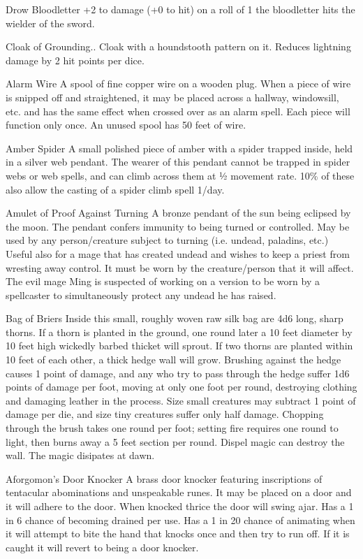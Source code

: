 Drow Bloodletter
+2 to damage (+0 to hit)
on a roll of 1 the bloodletter hits the wielder of the sword.


Cloak of Grounding..
Cloak with a houndstooth pattern on it.  Reduces lightning damage by 2 hit points per dice.  

Alarm Wire
A spool of fine copper wire on a wooden plug. When a piece of wire is snipped off and straightened, it may be placed across a hallway, windowsill, etc. and has the same effect when crossed over as an alarm spell. Each piece will function only once. An unused spool has 50 feet of wire.

Amber Spider
A small polished piece of amber with a spider trapped inside, held in a silver web pendant. The wearer of this pendant cannot be trapped in spider webs or web spells, and can climb across them at ½ movement rate. 10\% of these also allow the casting of a spider climb spell 1/day.

Amulet of Proof Against Turning
A bronze pendant of the sun being eclipsed by the moon. The pendant confers immunity to being turned or controlled. May be used by any person/creature subject to turning (i.e. undead, paladins, etc.) Useful also for a mage that has created undead and wishes to keep a priest from wresting away control. It must be worn by the creature/person that it will affect. The evil mage Ming is suspected of working on a version to be worn by a spellcaster to simultaneously protect any undead he has raised.

 

Bag of Briers
Inside this small, roughly woven raw silk bag are 4d6 long, sharp thorns. If a thorn is planted in the ground, one round later a 10 feet diameter by 10 feet high wickedly barbed thicket will sprout. If two thorns are planted within 10 feet of each other, a thick hedge wall will grow. Brushing against the hedge causes 1 point of damage, and any who try to pass through the hedge suffer 1d6 points of damage per foot, moving at only one foot per round, destroying clothing and damaging leather in the process. Size small creatures may subtract 1 point of damage per die, and size tiny creatures suffer only half damage. Chopping through the brush takes one round per foot; setting fire requires one round to light, then burns away a 5 feet section per round. Dispel magic can destroy the wall.  The magic disipates at dawn.


Aforgomon's Door Knocker
A brass door knocker featuring inscriptions of tentacular abominations and unspeakable runes.  It may be placed on a door and it will adhere to the door.  When knocked thrice the door will swing ajar.  Has a 1 in 6 chance of becoming drained per use.  Has a 1 in 20 chance of animating when it will attempt to bite the hand that knocks once and then try to run off.   If it is caught it will revert to being a door knocker.



